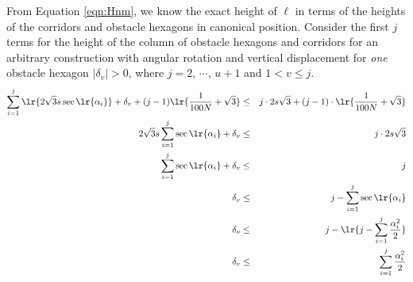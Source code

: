 

From Equation \ref{eqn:Hnm}, we know the exact height of $\ell$ in terms of the heights of the corridors and obstacle hexagons in canonical position.  
Consider the first $j$ terms for the height of the column of obstacle hexagons and corridors for an arbitrary construction with angular rotation and vertical displacement for \textit{one} obstacle hexagon $\vert \delta_v \vert > 0$, where $j=2$, $\cdots$, $u+1$ and $1 < v \leq j$.
\begin{eqnarray*}
\sum_{i=1}^j \lr{2 \sqrt{3} s \sec \lr{ \alpha_i}} + \delta_v  + (j-1) \lr{\frac{1}{100N}+\sqrt{3}} &\leq& j \cdot 2 s \sqrt{3} + (j-1) \cdot \lr{\frac{1}{100N}+\sqrt{3}}\\
2 \sqrt{3} s \sum_{i=1}^j \sec \lr{\alpha_i} + \delta_ v &\leq& j \cdot 2 s \sqrt{3}  \\
\sum_{i=1}^j \sec \lr{\alpha_i} + \delta_v &\leq& j\\
 \delta_v &\leq& j- \sum_{i=1}^j \sec \lr{\alpha_i}\\
 \delta_v &\leq& j - \lr{j - \sum_{i=1}^j \frac{\alpha_i^2}{2}}\\
\delta_v &\leq&  \sum_{i=1}^j \frac{\alpha_i^2}{2}
\end{eqnarray*}

